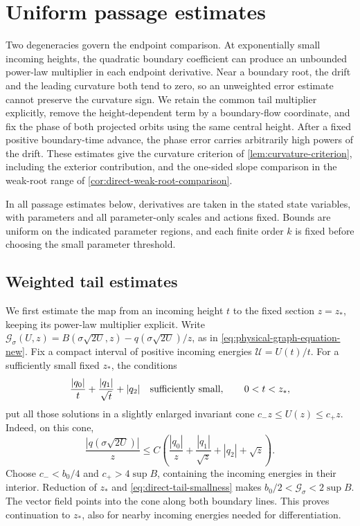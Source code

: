\section{Uniform passage estimates}
\label{sec:direct-passage-estimates}

Two degeneracies govern the endpoint comparison. At exponentially small
incoming heights, the quadratic boundary coefficient can produce an
unbounded power-law multiplier in each endpoint derivative. Near a
boundary root, the drift and the leading curvature both tend to zero,
so an unweighted error estimate cannot preserve the curvature sign.
We retain the common tail multiplier explicitly, remove the
height-dependent term by a boundary-flow coordinate, and fix the phase
of both projected orbits using the same central height. After a fixed
positive boundary-time advance, the phase error carries arbitrarily
high powers of the drift. These estimates give
the curvature criterion of \cref{lem:curvature-criterion}, including
the exterior contribution, and the one-sided slope comparison in the
weak-root range of \cref{cor:direct-weak-root-comparison}.

In all passage estimates below, derivatives are taken in the stated state
variables, with parameters and all parameter-only scales and actions
fixed. Bounds are uniform on the indicated parameter regions, and each
finite order \(k\) is fixed before choosing the small parameter threshold.

\subsection{Weighted tail estimates}

We first estimate the map from an incoming height \(t\) to the fixed
section \(z=z_*\), keeping its power-law multiplier explicit.
Write \(\mathcal G_\sigma(U,z)=B(\sigma\sqrt{2U},z)
-q(\sigma\sqrt{2U})/z\), as in
\eqref{eq:physical-graph-equation-new}. Fix a compact interval of
positive incoming energies \(\mathcal U=U(t)/t\). For a sufficiently small
fixed \(z_*\), the conditions
\begin{equation}
\label{eq:direct-tail-smallness}
 \frac{|q_0|}{t}+\frac{|q_1|}{\sqrt t}+|q_2|
 \quad\hbox{sufficiently small},\qquad 0<t<z_*,
\end{equation}
put all those solutions in a slightly enlarged invariant cone
\(c_-z\le U(z)\le c_+z\). Indeed, on this cone,
\[
 \frac{|q(\sigma\sqrt{2U})|}{z}
 \le C\left(\frac{|q_0|}{z}+\frac{|q_1|}{\sqrt z}
                  +|q_2|+\sqrt z\right).
\]
Choose \(c_-<b_0/4\) and \(c_+>4\sup B\), containing the incoming
energies in their interior. Reduction of \(z_*\) and
\eqref{eq:direct-tail-smallness} makes
\(b_0/2<\mathcal G_\sigma<2\sup B\). The vector field points into the
cone along both boundary lines.
This proves continuation to \(z_*\), also for nearby incoming
energies needed for differentiation.

